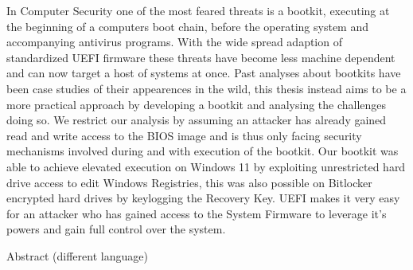 

\label{sec:abstract}

In Computer Security one of the most feared threats is a bootkit, executing at the beginning of a computers boot chain, before the operating system and accompanying antivirus programs. With the wide spread adaption of standardized UEFI firmware these threats have become less machine dependent and can now target a host of systems at once.
Past analyses about bootkits have been case studies of their appearences in the wild, this thesis instead aims to be a more practical approach by developing a bootkit and analysing the challenges doing so.
We restrict our analysis by assuming an attacker has already gained read and write access to the BIOS image and is thus only facing security mechanisms involved during and with execution of the bootkit.
Our bootkit was able to achieve elevated execution on Windows 11 by exploiting unrestricted hard drive access to edit Windows Registries, this was also possible on Bitlocker encrypted hard drives by keylogging the Recovery Key.
UEFI makes it very easy for an attacker who has gained access to the System Firmware to leverage it's powers and gain full control over the system.

\vspace*{20mm}

{Abstract (different language)}
\label{sec:abstract-diff}

\blindtext

